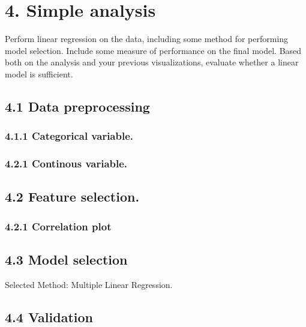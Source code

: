 \documentclass[
]{article}
\begin{document}
\hypertarget{simple-analysis}{%
\section{4. Simple analysis}\label{simple-analysis}}

Perform linear regression on the data, including some method for
performing model selection. Include some measure of performance on the
final model. Based both on the analysis and your previous
visualizations, evaluate whether a linear model is sufficient.

\hypertarget{data-preprocessing}{%
\subsection{4.1 Data preprocessing}\label{data-preprocessing}}

\hypertarget{categorical-variable.}{%
\subsubsection{4.1.1 Categorical
variable.}\label{categorical-variable.}}

\hypertarget{continous-variable.}{%
\subsubsection{4.2.1 Continous variable.}\label{continous-variable.}}

\hypertarget{feature-selection.}{%
\subsection{4.2 Feature selection.}\label{feature-selection.}}

\hypertarget{correlation-plot}{%
\subsubsection{4.2.1 Correlation plot}\label{correlation-plot}}

\hypertarget{model-selection}{%
\subsection{4.3 Model selection}\label{model-selection}}

Selected Method: Multiple Linear Regression.

\hypertarget{validation}{%
\subsection{4.4 Validation}\label{validation}}
\end{document}
